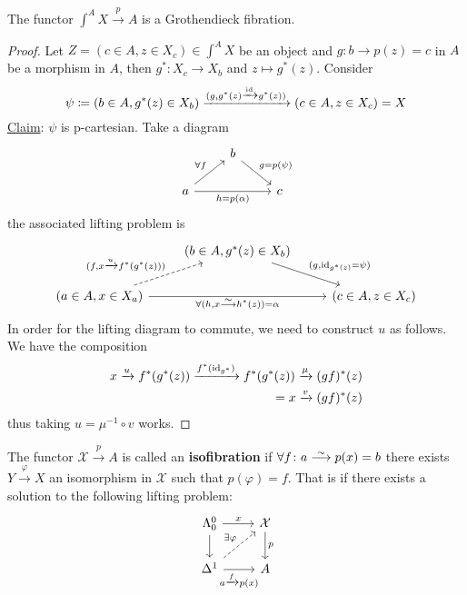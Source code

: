 \begin{prop}
	The functor $ \int^A X \xrightarrow{ p } A $ is a Grothendieck fibration.
\end{prop} 

\begin{proof}
	Let $ Z = ( c \in A , z \in X_c ) \in \int^A X $ be an object and $g \colon b \to p ( z ) = c $ in $ A $ be a morphism in $ A $, then $ g^* \colon X_c \to X_b $ and $ z \mapsto g^* ( z ) $.
	Consider 
	\[
		\psi \coloneqq ( b \in A , g^* ( z ) \in X_b ) 
		\xrightarrow{ ( g , g^* ( z ) \xrightarrow{ \operatorname{id} } g^* ( z ) ) }
		( c \in A , z \in X_c ) = X 
	\]
	\underline{Claim}: $ \psi $ is p-cartesian.
	Take a diagram
	\[
	\begin{tikzcd}
		& 
		b
		\ar[rd, " { g = p ( \psi ) }"]
		\\
		a
		\ar[ru, " \forall f "]
		\ar[rr, " { h = p ( \alpha ) }"']
		&&
		c
	\end{tikzcd}
	\]
	the associated lifting problem is
	\[
	\begin{tikzcd}
		&
		( b \in A , g^* ( z ) \in X_b )
		\ar[rd, "{ ( g , \id_{ g^* ( z ) } = \psi ) }" ] 	
		\\
		( a \in A , x \in X_a )
		\ar[rr, " {\forall ( h , x \isomorphism h^* ( z ) ) = \alpha } "' ]
		\ar[ru, dashed , " { ( f , x \xrightarrow{ u } f^* ( g^* ( z ) ) ) } "]
		&&
		( c \in A , z \in X_c )
	\end{tikzcd}
	\]
	In order for the lifting diagram to commute, we need to construct $ u $ as follows.
	We have the composition
	\begin{align*}
		x \xrightarrow{ u } f^* ( g^* ( z ) ) \xrightarrow{ f^* ( \operatorname{id}_{ g^* } ) } f^* ( g^* ( z ) ) \xrightarrow{ \mu } ( gf )^* ( z )
		\\
		= x \xrightarrow{v} ( g f )^* ( z )  
	\end{align*}
	thus taking $ u = \mu^{ - 1 } \circ v $ works.
\end{proof}


\begin{defi}
\label{isofibration}
	The functor $ \mathcal{ X } \xrightarrow{p} A $ is called an \textbf{isofibration}
	if $ \forall f \colon a \isomorphism p ( x ) = b $ there exists $ Y \xrightarrow{\varphi} X $ an isomorphism in $ \mathcal{ X } $ such that $ p ( \varphi ) = f $.
	That is if there exists a solution to the following lifting problem:
	\[
	\begin{tikzcd}
		\Lambda_0^0
		\ar[r, " x "]
		\ar[d]
		& 
		\mathcal{ X }
		\ar[d, " p "]
		\\
		\Delta^1
		\ar[ru, dashed, " \exists \varphi"]
		\ar[r, " a \xrightarrow{f} p ( x ) "']
		&
		A
	\end{tikzcd}
	\]
\end{defi}

